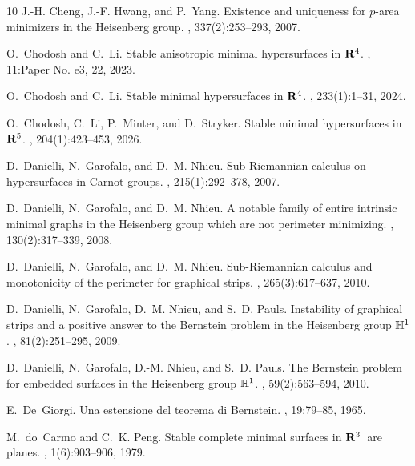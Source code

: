 \begin{thebibliography}{10}
J.-H. Cheng, J.-F. Hwang, and P.~Yang.
\newblock Existence and uniqueness for {$p$}-area minimizers in the {H}eisenberg group.
, 337(2):253--293, 2007.

O.~Chodosh and C.~Li.
\newblock Stable anisotropic minimal hypersurfaces in {${\bf R}^4$}.
, 11:Paper No. e3, 22, 2023.

O.~Chodosh and C.~Li.
\newblock Stable minimal hypersurfaces in {${\bf R}^4$}.
, 233(1):1--31, 2024.

O.~Chodosh, C.~Li, P.~Minter, and D.~Stryker.
\newblock Stable minimal hypersurfaces in {$\bold R^5$}.
, 204(1):423--453, 2026.

D.~Danielli, N.~Garofalo, and D.~M. Nhieu.
\newblock Sub-{R}iemannian calculus on hypersurfaces in {C}arnot groups.
, 215(1):292--378, 2007.

D.~Danielli, N.~Garofalo, and D.~M. Nhieu.
\newblock A notable family of entire intrinsic minimal graphs in the {H}eisenberg group which are not perimeter minimizing.
, 130(2):317--339, 2008.

D.~Danielli, N.~Garofalo, and D.~M. Nhieu.
\newblock Sub-{R}iemannian calculus and monotonicity of the perimeter for graphical strips.
, 265(3):617--637, 2010.

D.~Danielli, N.~Garofalo, D.~M. Nhieu, and S.~D. Pauls.
\newblock Instability of graphical strips and a positive answer to the {B}ernstein problem in the {H}eisenberg group {$\Bbb H^1$}.
, 81(2):251--295, 2009.

D.~Danielli, N.~Garofalo, D.-M. Nhieu, and S.~D. Pauls.
\newblock The {B}ernstein problem for embedded surfaces in the {H}eisenberg group {$\Bbb H^1$}.
, 59(2):563--594, 2010.

E.~De~Giorgi.
\newblock Una estensione del teorema di {B}ernstein.
, 19:79--85, 1965.

M.~do~Carmo and C.~K. Peng.
\newblock Stable complete minimal surfaces in {${\bf R}\sp{3}$}\ are planes.
, 1(6):903--906, 1979.


\end{thebibliography}
